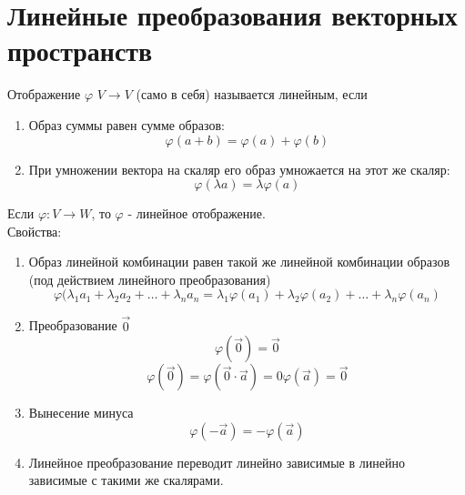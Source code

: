 \documentclass[a4paper, 12pt]{report}
\begin{document}
\section{Линейные преобразования векторных пространств}
Отображение $\varphi$ $V \rightarrow V$ (само в себя) называется линейным, если
\begin{enumerate}
    \item Образ суммы равен сумме образов:
    $$\varphi(a+b)=\varphi(a)+\varphi(b)$$
    \item При умножении вектора на скаляр его образ умножается на этот же скаляр:
    $$\varphi(\lambda a)=\lambda \varphi(a)$$
\end{enumerate}
Если $\varphi: V \rightarrow W$, то $\varphi$ - линейное отображение.\\
Свойства:
\begin{enumerate}
    \item Образ линейной комбинации равен такой же линейной комбинации образов (под действием линейного преобразования)
    $$\varphi(\lambda_1a_1+\lambda_2a_2+\dots+\lambda_na_n=\lambda_1\varphi(a_1)+\lambda_2\varphi(a_2)+\dots+\lambda_n\varphi(a_n)$$
    \item Преобразование $\vec0$
    $$\varphi(\vec0)=\vec0$$
    $$\varphi(\vec0)=\varphi(\vec0\cdot\vec a)=0\varphi(\vec a)=\vec0$$
    \item Вынесение минуса
    $$\varphi(-\vec a)=-\varphi(\vec a)$$
    \item Линейное преобразование переводит линейно зависимые в линейно зависимые с такими же скалярами.
\end{enumerate}
\end{document}

